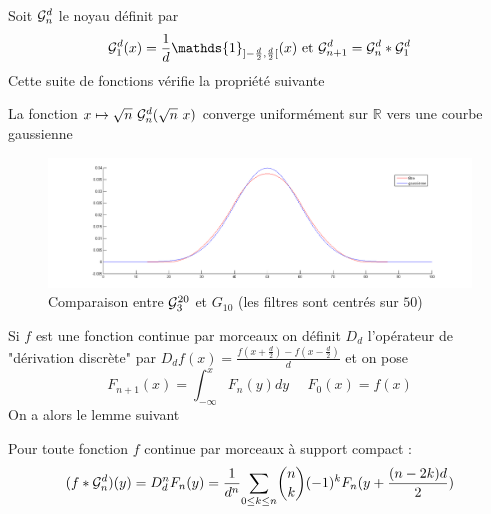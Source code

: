 Soit $\mathcal{G}_n^d$ le noyau définit par 
\begin{equation*}
\Gcal_1^d(x)=\frac{1}{d}\mathds{1}_{]-\frac{d}{2},\frac{d}{2}[}(x) \text{ et } \Gcal_{n+1}^d= \Gcal_n^d * \Gcal_1^d 
\label{formule_convol_n_int}
\end{equation*}
Cette suite de fonctions vérifie la propriété suivante
\begin{prop}
La fonction $x\mapsto \sqrt{n}~\mathcal{G}_n^d(\sqrt{n}~x)$ converge uniformément sur $\mathbb{R}$ vers une courbe gaussienne 
\end{prop}
\begin{figure}
\centering
\includegraphics[width=15cm]{filtre_g3.png}
\caption{Comparaison entre $\mathcal{G}_3^{20}$ et $G_{10}$ (les filtres sont centrés sur $50$)}
\end{figure}
Si $f$ est une fonction continue par morceaux on définit $D_d$ l'opérateur de "dérivation discrète" par $D_d f(x)=\frac{f(x+\frac{d}{2})-f(x-\frac{d}{2})}{d}$  et on pose
\begin{equation*}
F_{n+1}(x)= \int_{-\infty}^{x}F_{n}(y)dy~~~~~~F_{0}(x)= f(x)
\end{equation*}
On a alors le lemme suivant 
\begin{prop} Pour toute fonction $f$ continue par morceaux à support compact :
\begin{equation}
 (f*\mathcal{G}_n^d)(y)=D_d^n F_{n}(y)= \frac{1}{d^n}\underset{0 \le k\le n}{\sum} \binom{n}{k}(-1)^{k} F_{n}(y+\frac{(n-2k)d}{2})
\end{equation}
\end{prop}
